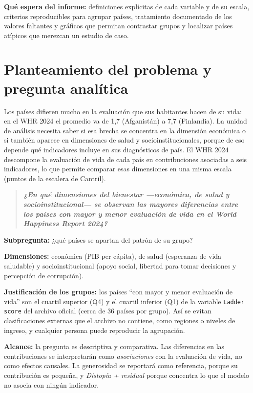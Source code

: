 \documentclass[11pt,a4paper]{article}
\begin{document}
\textbf{Qué espera del informe:} definiciones explícitas de cada variable y de su escala, criterios
reproducibles para agrupar países, tratamiento documentado de los valores faltantes y gráficos que permitan
contrastar grupos y localizar países atípicos que merezcan un estudio de caso.

\section{Planteamiento del problema y pregunta analítica}

Los países difieren mucho en la evaluación que sus habitantes hacen de su vida: en el WHR 2024 el promedio va
de 1,7 (Afganistán) a 7,7 (Finlandia). La unidad de análisis necesita saber si esa brecha se concentra en la
dimensión económica o si también aparece en dimensiones de salud y socioinstitucionales, porque de eso depende
qué indicadores incluye en sus diagnósticos de país. El WHR 2024 descompone la evaluación de vida de cada país
en contribuciones asociadas a seis indicadores, lo que permite comparar esas dimensiones en una misma escala
(puntos de la escalera de Cantril).

\begin{quote}
\textbf{\textit{¿En qué dimensiones del bienestar ---económica, de salud y socioinstitucional--- se observan las
mayores diferencias entre los países con mayor y menor evaluación de vida en el World Happiness Report 2024?}}
\end{quote}

\textbf{Subpregunta:} ¿qué países se apartan del patrón de su grupo?

\textbf{Dimensiones:} económica (PIB per cápita), de salud (esperanza de vida saludable) y socioinstitucional
(apoyo social, libertad para tomar decisiones y percepción de corrupción).

\textbf{Justificación de los grupos:} los países ``con mayor y menor evaluación de vida'' son el cuartil
superior (Q4) y el cuartil inferior (Q1) de la variable \texttt{Ladder score} del archivo oficial (cerca de 36
países por grupo). Así se evitan clasificaciones externas que el archivo no contiene, como regiones o niveles
de ingreso, y cualquier persona puede reproducir la agrupación.

\textbf{Alcance:} la pregunta es descriptiva y comparativa. Las diferencias en las contribuciones se
interpretarán como \emph{asociaciones} con la evaluación de vida, no como efectos causales. La generosidad se
reportará como referencia, porque su contribución es pequeña, y \textit{Distopía + residual} porque concentra
lo que el modelo no asocia con ningún indicador.
\end{document}
